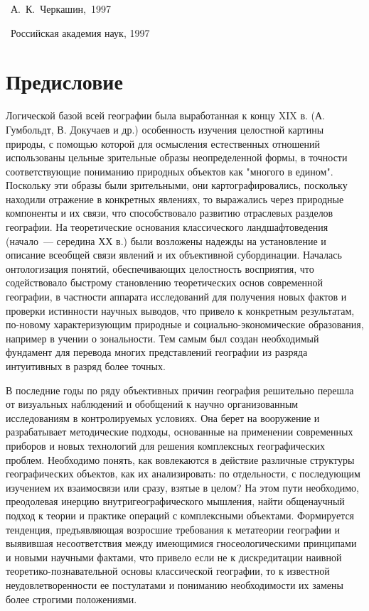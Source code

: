 \documentclass[14pt,draft,openany]{extbook}
\begin{document}
\vfill{}
\noindent{}\begin{minipage}[t]{10em}
\mbox{}\par
\ISBN{}
\end{minipage}\hfill
\begin{minipage}[t]{0.51\linewidth{}}
\noindent\sucopyright~А.~К.~Черкашин,~1997\par
\noindent\sucopyright~Российская академия наук, 1997
\end{minipage}
\endgroup
\newpage
\tableofcontents{}
\chapter*{Предисловие}
Логической базой всей географии была выработанная к концу XIX в. (А. Гумбольдт, В. Докучаев и др.) особенность изучения целостной картины природы, с помощью которой для осмысления естественных отношений использованы цельные зрительные образы неопределенной формы, в точности соответствующие пониманию природных объектов как "многого в едином". Поскольку эти образы были зрительными, они картографировались, поскольку находили отражение в конкретных явлениях, то выражались через природные компоненты и их связи, что способствовало развитию отраслевых разделов географии. На теоретические основания классического ландшафтоведения (начало~--- середина ХХ в.) были возложены надежды на установление и описание всеобщей связи явлений и их объективной субординации. Началась онтологизация понятий, обеспечивающих целостность восприятия, что содействовало быстрому становлению теоретических основ современной географии, в частности аппарата исследований для получения новых фактов и проверки истинности научных выводов, что привело к конкретным результатам, по-новому характеризующим природные и социально-экономические образования, например в учении о зональности. Тем самым был создан необходимый фундамент для перевода многих представлений географии из разряда интуитивных в разряд более точных.

В последние годы по ряду объективных причин география решительно перешла от визуальных наблюдений и обобщений к научно организованным исследованиям в контролируемых условиях. Она берет на вооружение и разрабатывает методические подходы, основанные на применении современных приборов и новых технологий для решения комплексных географических проблем. Необходимо понять, как вовлекаются в действие различные структуры географических объектов, как их анализировать: по отдельности, с последующим изучением их взаимосвязи или сразу, взятые в целом? На этом пути необходимо, преодолевая инерцию внутригеографического мышления, найти общенаучный подход к теории и практике операций с комплексными объектами. Формируется тенденция, предъявляющая возросшие требования к метатеории географии и выявившая несоответствия между имеющимися гносеологическими принципами и новыми научными фактами, что привело если не к дискредитации наивной теоретико-познавательной основы классической географии, то к известной неудовлетворенности ее постулатами и пониманию необходимости их замены более строгими положениями.
\end{document}
